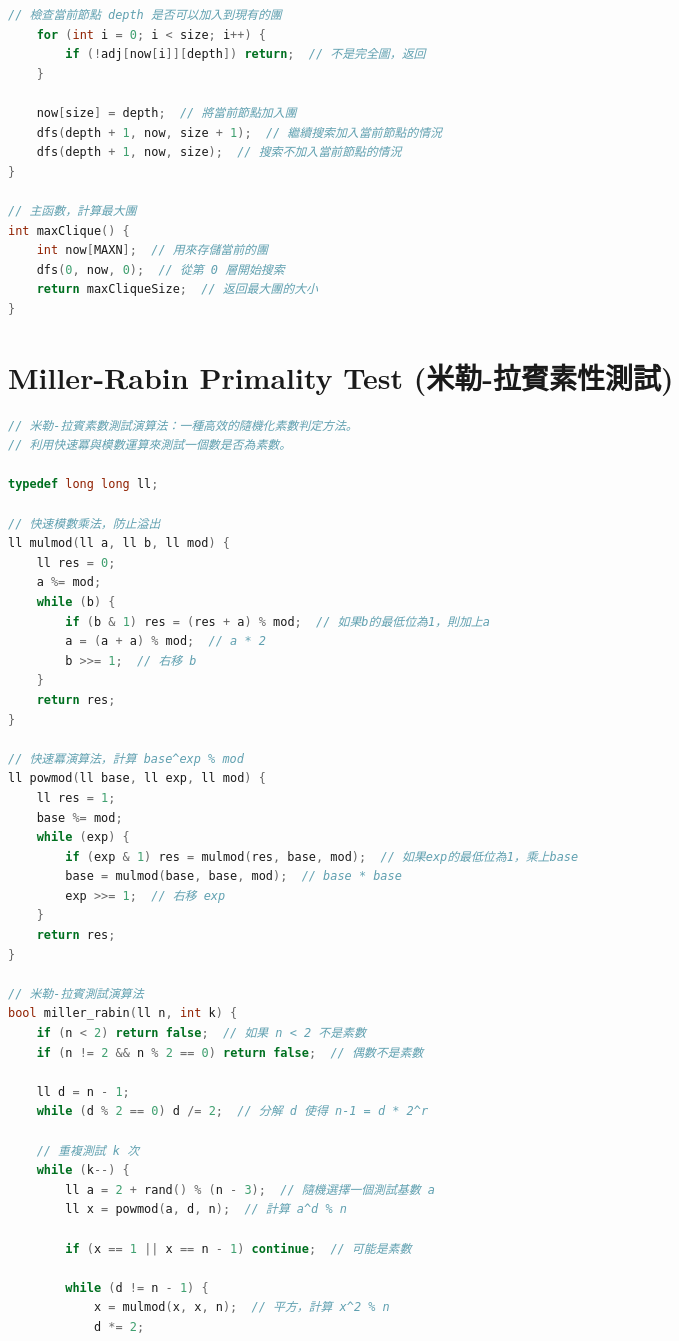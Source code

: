 \documentclass{article}
\begin{document}
\begin{multicols}{2}
\begin{lstlisting}[language=C++]
    // 檢查當前節點 depth 是否可以加入到現有的團
    for (int i = 0; i < size; i++) {
        if (!adj[now[i]][depth]) return;  // 不是完全圖，返回
    }

    now[size] = depth;  // 將當前節點加入團
    dfs(depth + 1, now, size + 1);  // 繼續搜索加入當前節點的情況
    dfs(depth + 1, now, size);  // 搜索不加入當前節點的情況
}

// 主函數，計算最大團
int maxClique() {
    int now[MAXN];  // 用來存儲當前的團
    dfs(0, now, 0);  // 從第 0 層開始搜索
    return maxCliqueSize;  // 返回最大團的大小
}
\end{lstlisting}

\section{Miller-Rabin Primality Test (米勒-拉賓素性測試)}

\begin{lstlisting}[language=C++]
// 米勒-拉賓素數測試演算法：一種高效的隨機化素數判定方法。
// 利用快速冪與模數運算來測試一個數是否為素數。

typedef long long ll;

// 快速模數乘法，防止溢出
ll mulmod(ll a, ll b, ll mod) {
    ll res = 0;
    a %= mod;
    while (b) {
        if (b & 1) res = (res + a) % mod;  // 如果b的最低位為1，則加上a
        a = (a + a) % mod;  // a * 2
        b >>= 1;  // 右移 b
    }
    return res;
}

// 快速冪演算法，計算 base^exp % mod
ll powmod(ll base, ll exp, ll mod) {
    ll res = 1;
    base %= mod;
    while (exp) {
        if (exp & 1) res = mulmod(res, base, mod);  // 如果exp的最低位為1，乘上base
        base = mulmod(base, base, mod);  // base * base
        exp >>= 1;  // 右移 exp
    }
    return res;
}

// 米勒-拉賓測試演算法
bool miller_rabin(ll n, int k) {
    if (n < 2) return false;  // 如果 n < 2 不是素數
    if (n != 2 && n % 2 == 0) return false;  // 偶數不是素數

    ll d = n - 1;
    while (d % 2 == 0) d /= 2;  // 分解 d 使得 n-1 = d * 2^r

    // 重複測試 k 次
    while (k--) {
        ll a = 2 + rand() % (n - 3);  // 隨機選擇一個測試基數 a
        ll x = powmod(a, d, n);  // 計算 a^d % n

        if (x == 1 || x == n - 1) continue;  // 可能是素數

        while (d != n - 1) {
            x = mulmod(x, x, n);  // 平方，計算 x^2 % n
            d *= 2;


\end{lstlisting}
\end{multicols}
\end{document}
